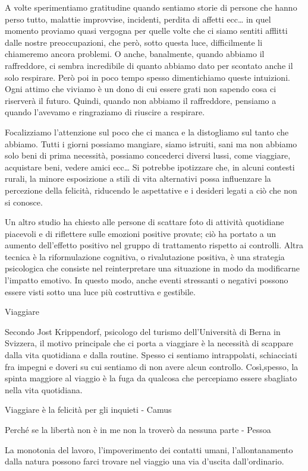 \documentclass[12pt]{book} %
\begin{document}
A volte sperimentiamo gratitudine quando sentiamo storie di persone che hanno perso tutto, malattie improvvise, incidenti,
perdita di affetti ecc… in quel momento proviamo quasi vergogna per quelle volte che ci siamo sentiti afflitti dalle
nostre preoccupazioni, che però, sotto questa luce, difficilmente li chiameremo ancora problemi. O anche,
banalmente, quando abbiamo il raffreddore, ci sembra incredibile di quanto abbiamo dato per scontato anche il solo
respirare. Però poi in poco tempo spesso dimentichiamo queste intuizioni. Ogni attimo che viviamo è un dono di cui
essere grati non sapendo cosa ci riserverà il futuro. Quindi, quando non abbiamo il raffreddore, pensiamo a quando l'avevamo e ringraziamo di riuscire a respirare.

Focalizziamo l'attenzione sul poco che ci manca e la distogliamo sul tanto che abbiamo. Tutti i
giorni possiamo mangiare, siamo istruiti, sani ma non abbiamo solo beni di prima necessità, possiamo concederci diversi
lussi, come viaggiare, acquistare beni, vedere amici ecc…
Si potrebbe ipotizzare che, in alcuni contesti rurali, la minore esposizione a stili di vita alternativi possa influenzare la percezione della felicità, riducendo le aspettative e i desideri legati a ciò che non si conosce.

Un altro studio ha chiesto alle persone di scattare foto di attività quotidiane piacevoli e di riflettere sulle emozioni positive provate; ciò ha portato a un aumento dell'effetto positivo nel gruppo di trattamento rispetto ai controlli.
Altra tecnica è la riformulazione cognitiva, o rivalutazione positiva, è una strategia psicologica che consiste nel reinterpretare una situazione in modo da modificarne l’impatto emotivo. In questo modo, anche eventi stressanti o negativi possono essere visti sotto una luce più costruttiva e gestibile.

\begin{mdframed}[linewidth=1pt]
Viaggiare

Secondo Jost Krippendorf, psicologo del turismo dell'Università di Berna in Svizzera, il motivo principale che ci porta
a viaggiare è la necessità di scappare dalla vita quotidiana e dalla routine. Spesso ci sentiamo intrappolati,
schiacciati fra impegni e doveri su cui sentiamo di non avere alcun controllo. Così,spesso, la spinta maggiore al viaggio è la
fuga da qualcosa che percepiamo essere sbagliato nella vita quotidiana. 

Viaggiare è la felicità per gli inquieti - Camus

Perché se la libertà non è in me non la troverò da nessuna parte - Pessoa

La monotonia del lavoro, l'impoverimento dei contatti umani, l'allontanamento dalla natura possono farci trovare nel viaggio
una via d'uscita dall'ordinario.
\end{mdframed}
\end{document}
